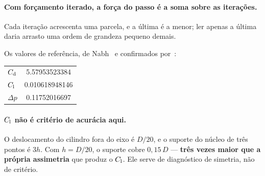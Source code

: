 \paragraph{Com forçamento iterado, a força do passo é a soma sobre as
iterações.} Cada iteração acrescenta uma parcela, e a última é a menor; ler
apenas a última daria arrasto uma ordem de grandeza pequeno demais.

Os valores de referência, de Nabh~\cite{nabh1998} e confirmados
por~\cite{john2001}:
\begin{center}
\begin{tabular}{lS[table-format=1.11]}
  \toprule
  $C_{\mathrm{d}}$       & 5.57953523384 \\
  $C_{\mathrm{l}}$       & 0.010618948146 \\
  $\Delta p$  & 0.11752016697 \\
  \bottomrule
\end{tabular}
\end{center}

\paragraph{$C_{\mathrm{l}}$ não é critério de acurácia aqui.} O deslocamento do cilindro
fora do eixo é $D/20$, e o suporte do núcleo de três pontos é $3h$. Com
$h = D/20$, o suporte cobre $0{,}15\,D$ --- \textbf{três vezes maior que a
própria assimetria} que produz o $C_{\mathrm{l}}$. Ele serve de diagnóstico de simetria,
não de critério.
